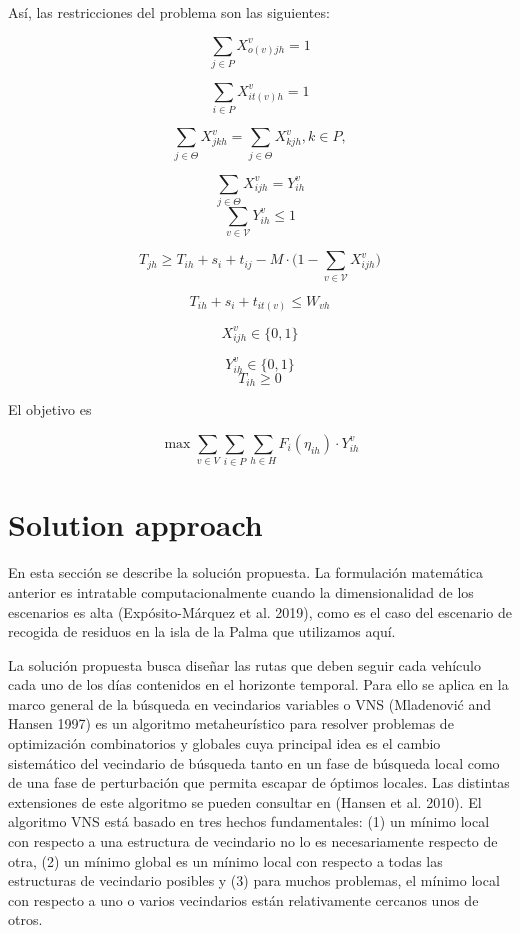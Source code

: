 \documentclass[
]{article}
\begin{document}
Así, las restricciones del problema son las siguientes:

\[
\sum_{j \in P} X_{o(v)jh}^v= 1 
\]

\[
\sum_{i \in P} X_{it(v)h}^v= 1 
\]

\[
\sum_{j\in\Theta}X_{jkh}^v = \sum_{j\in\Theta}X_{kjh}^v, k\in P,   
\]

\[
\sum_{j\in\Theta} X_{ijh}^v = Y_{ih}^v
\] \[
\sum_{v\in \mathcal{V}} Y_{ih}^v \leq 1
\]

\[
T_{jh} \geq T_{ih} + s_i + t_{ij} - M\cdot \big(1-\sum_{v\in \mathcal{V}} X_{ijh}^v\big)
\]

\[
T_{ih} + s_i + t_{it(v)} \leq W_{vh}
\]

\[
X_{ijh}^v \in \{0, 1\}
\]

\[
Y_{ih}^v \in \{0, 1\}
\] \[
T_{ih} \geq 0 
\]

El objetivo es

\[
\max \sum_{v \in V}\sum_{i\in P} \sum_{h\in H} F_i(\eta_{ih})\cdot Y_{ih}^v
\]

\hypertarget{solution-approach}{%
\section{Solution approach}\label{solution-approach}}

En esta sección se describe la solución propuesta. La formulación
matemática anterior es intratable computacionalmente cuando la
dimensionalidad de los escenarios es alta (Expósito-Márquez et al.
2019), como es el caso del escenario de recogida de residuos en la isla
de la Palma que utilizamos aquí.

La solución propuesta busca diseñar las rutas que deben seguir cada
vehículo cada uno de los días contenidos en el horizonte temporal. Para
ello se aplica en la marco general de la búsqueda en vecindarios
variables o VNS (Mladenović and Hansen 1997) es un algoritmo
metaheurístico para resolver problemas de optimización combinatorios y
globales cuya principal idea es el cambio sistemático del vecindario de
búsqueda tanto en un fase de búsqueda local como de una fase de
perturbación que permita escapar de óptimos locales. Las distintas
extensiones de este algoritmo se pueden consultar en (Hansen et al.
2010). El algoritmo VNS está basado en tres hechos fundamentales: (1) un
mínimo local con respecto a una estructura de vecindario no lo es
necesariamente respecto de otra, (2) un mínimo global es un mínimo local
con respecto a todas las estructuras de vecindario posibles y (3) para
muchos problemas, el mínimo local con respecto a uno o varios
vecindarios están relativamente cercanos unos de otros.
\end{document}
